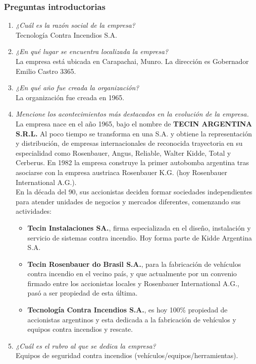 \documentclass[a4paper,10pt]{article}
\begin{document}
		\subsubsection{Preguntas introductorias}
			\begin{enumerate}
				\item \textit{¿Cuál es la razón social de la empresa?}\\
				Tecnología Contra Incendios S.A.
				
				\item \textit{¿En qué lugar se encuentra localizada la empresa?}\\
				La empresa está ubicada en Carapachai, Munro. La dirección es Gobernador Emilio Castro 3365.
				
				\item \textit{¿En qué año fue creada la organización?}\\
				La organización fue creada en 1965.				
				
				\item \textit{Mencione los acontecimientos más destacados en la evolución de la empresa.}\\
				La empresa nace en el año 1965, bajo el nombre de \textbf{TECIN ARGENTINA S.R.L.} Al poco tiempo se transforma en una S.A. y obtiene la representación y distribución, de empresas internacionales de reconocida trayectoria en su especialidad como Rosenbauer, Angus, Reliable, Walter Kidde, Total y Cerberus. En 1982 la empresa construye la primer autobomba argentina tras asociarse con la empresa austriaca Rosenbauer K.G. (hoy Rosenbauer International A.G.).\\
				En la década del 90, sus accionistas deciden formar sociedades independientes para atender unidades de negocios y mercados diferentes, comenzando sus actividades: 
				\begin{itemize}
					\item \textbf{Tecin Instalaciones SA.}, firma especializada en el diseño, instalación y servicio de sistemas contra incendio. Hoy forma parte de Kidde Argentina S.A.

					\item \textbf{Tecin Rosenbauer do Brasil S.A.}, para la fabricación de vehículos contra incendio en el vecino país, y que actualmente por un convenio firmado entre los accionistas locales y Rosenbauer International A.G., pasó a ser propiedad de esta última.

					\item \textbf{Tecnología Contra Incendios S.A.}, es hoy 100\% propiedad de accionistas argentinos y esta dedicada a la fabricación de vehículos y equipos contra incendios y rescate.
				\end{itemize}
				\item \textit{¿Cuál es el rubro al que se dedica la empresa?}\\
				Equipos de seguridad contra incendios (vehículos/equipos/herramientas).
			

\end{enumerate}
\end{document}
